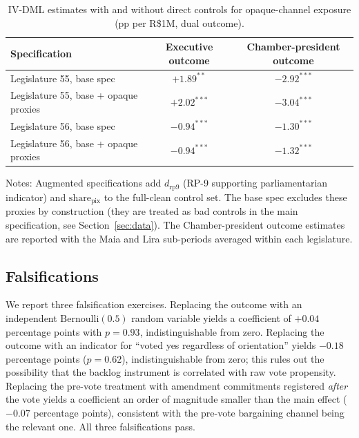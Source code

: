 \documentclass[preprint,12pt,authoryear]{elsarticle}
\begin{document}
\begin{table}[htbp]
\centering
\caption{IV-DML estimates with and without direct controls for opaque-channel exposure (pp per R\$1M, dual outcome).}
\label{tab:rp9_controls}
\begin{threeparttable}
\small
\begin{tabular}{lcc}
\toprule
Specification & Executive outcome & Chamber-president outcome \\
\midrule
Legislature 55, base spec                 & $+1.89^{**}$  & $-2.92^{***}$ \\
Legislature 55, base + opaque proxies     & $+2.02^{***}$ & $-3.04^{***}$ \\
Legislature 56, base spec                 & $-0.94^{***}$ & $-1.30^{***}$ \\
Legislature 56, base + opaque proxies     & $-0.94^{***}$ & $-1.32^{***}$ \\
\bottomrule
\end{tabular}
\begin{tablenotes}
\small
\item Notes: Augmented specifications add $d_{\mathrm{rp9}}$ (RP-9 supporting parliamentarian indicator) and $\mathrm{share}_{\mathrm{pix}}$ to the full-clean control set. The base spec excludes these proxies by construction (they are treated as bad controls in the main specification, see Section~\ref{sec:data}). The Chamber-president outcome estimates are reported with the Maia and Lira sub-periods averaged within each legislature.
\end{tablenotes}
\end{threeparttable}
\end{table}

\subsection{Falsifications}
\label{app:falsifications}

We report three falsification exercises. Replacing the outcome with an independent $\mathrm{Bernoulli}(0.5)$ random variable yields a coefficient of $+0.04$ percentage points with $p = 0.93$, indistinguishable from zero. Replacing the outcome with an indicator for ``voted yes regardless of orientation'' yields $-0.18$ percentage points ($p = 0.62$), indistinguishable from zero; this rules out the possibility that the backlog instrument is correlated with raw vote propensity. Replacing the pre-vote treatment with amendment commitments registered \emph{after} the vote yields a coefficient an order of magnitude smaller than the main effect ($-0.07$ percentage points), consistent with the pre-vote bargaining channel being the relevant one. All three falsifications pass.
\end{document}
